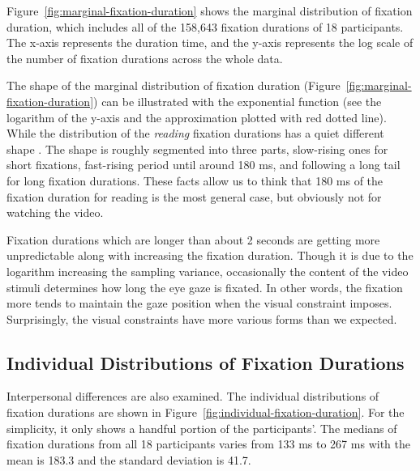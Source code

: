 \documentclass[10pt,letterpaper]{article}
\begin{document}
Figure~\ref{fig:marginal-fixation-duration} shows the marginal distribution of fixation duration, which includes all of the 158,643 fixation durations of 18 participants. The x-axis represents the duration time, and the y-axis represents the log scale of the number of fixation durations across the whole data.

The shape of the marginal distribution of fixation duration (Figure~\ref{fig:marginal-fixation-duration}) can be illustrated with the exponential function (see the logarithm of the y-axis and the approximation plotted with red dotted line). While the distribution of the \textit{reading} fixation durations has a quiet different shape \cite{Feng2006}. The shape is roughly segmented into three parts, slow-rising ones for short fixations, fast-rising period until around 180 ms, and following a long tail for long fixation durations. These facts allow us to think that 180 ms of the fixation duration for reading is the most general case, but obviously not for watching the video.

Fixation durations which are longer than about 2 seconds are getting more unpredictable along with increasing the fixation duration. Though it is due to the logarithm increasing the sampling variance, occasionally the content of the video stimuli determines how long the eye gaze is fixated. In other words, the fixation more tends to maintain the gaze position when the visual constraint imposes. Surprisingly, the visual constraints have more various forms than we expected.

\subsection{Individual Distributions of Fixation Durations}

Interpersonal differences are also examined. The individual distributions of fixation durations are shown in Figure~\ref{fig:individual-fixation-duration}. For the simplicity, it only shows a handful portion of the participants'. The medians of fixation durations from all 18 participants varies from 133 ms to 267 ms with the mean is 183.3 and the standard deviation is 41.7.
\end{document}
